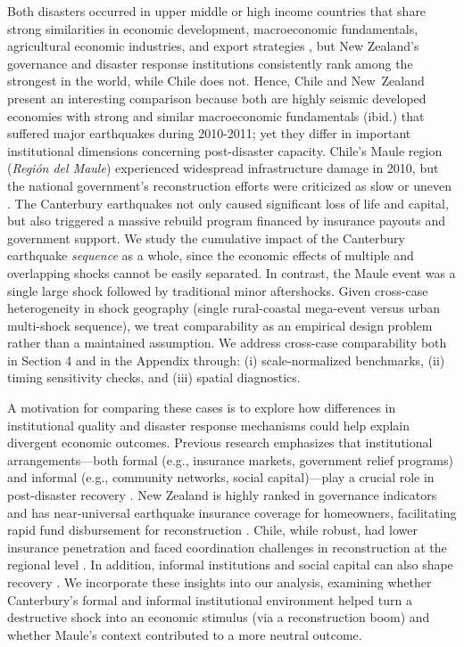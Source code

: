 \documentclass[12pt]{article}
\begin{document}
Both disasters occurred in upper middle or high income countries that share strong similarities in economic development, macroeconomic fundamentals, agricultural economic industries, and export strategies \parencite{gonzalez2020diversificacion}, but New Zealand's governance and disaster response institutions consistently rank among the strongest in the world, while Chile does not. Hence, Chile and New Zealand present an interesting comparison because both are highly seismic developed economies with strong and similar macroeconomic fundamentals (ibid.) that suffered major earthquakes during 2010-2011; yet they differ in important institutional dimensions concerning post-disaster capacity. Chile’s Maule region (\textit{Región del Maule}) experienced widespread infrastructure damage in 2010, but the national government’s reconstruction efforts were criticized as slow or uneven \parencite{dussaillant2014trust, cardenasjiron2012chilean}. The Canterbury earthquakes not only caused significant loss of life and capital, but also triggered a massive rebuild program financed by insurance payouts and government support. We study the cumulative impact of the Canterbury earthquake \textit{sequence} as a whole, since the economic effects of multiple and overlapping shocks cannot be easily separated. In contrast, the Maule event was a single large shock followed by traditional minor aftershocks. Given cross-case heterogeneity in shock geography (single rural-coastal mega-event versus urban multi-shock sequence), we treat comparability as an empirical design problem rather than a maintained assumption. We address cross-case comparability both in Section 4 and in the Appendix through: (i) scale-normalized benchmarks, (ii) timing sensitivity checks, and (iii) spatial diagnostics.

A motivation for comparing these cases is to explore how differences in institutional quality and disaster response mechanisms could help explain divergent economic outcomes. Previous research emphasizes that institutional arrangements—both formal (e.g., insurance markets, government relief programs) and informal (e.g., community networks, social capital)—play a crucial role in post-disaster recovery \parencite{noy2009macroeconomic, rayamajhee2022coproduction, storr2016community, storr2017sandy}. New Zealand is highly ranked in governance indicators and has near-universal earthquake insurance coverage for homeowners, facilitating rapid fund disbursement for reconstruction \parencite{nguyen2020insurance}. Chile, while robust, had lower insurance penetration and faced coordination challenges in reconstruction at the regional level \parencite{cardenasjiron2012chilean, eclac2010overview}. In addition, informal institutions and social capital can also shape recovery \parencite{grube2018embedded, storr2016community}. We incorporate these insights into our analysis, examining whether Canterbury’s formal and informal institutional environment helped turn a destructive shock into an economic stimulus (via a reconstruction boom) and whether Maule's context contributed to a more neutral outcome.
\end{document}
